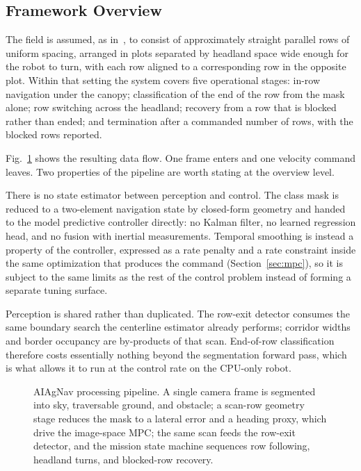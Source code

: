 \documentclass[conference]{IEEEtran}
\begin{document}
\subsection{Framework Overview}
The field is assumed, as in~\cite{kim2025pagnav}, to consist of approximately
straight parallel rows of uniform spacing, arranged in plots separated by
headland space wide enough for the robot to turn, with each row aligned to a
corresponding row in the opposite plot. Within that setting the system covers
five operational stages: in-row navigation under the canopy; classification of
the end of the row from the mask alone; row switching across the headland;
recovery from a row that is blocked rather than ended; and termination after a
commanded number of rows, with the blocked rows reported.

Fig.~\ref{fig:pipeline} shows the resulting data flow. One frame enters and one
velocity command leaves. Two properties of the pipeline are worth stating at
the overview level.

There is no state estimator between perception and control. The class mask is
reduced to a two-element navigation state by closed-form geometry and handed to
the model predictive controller directly: no Kalman filter, no learned
regression head, and no fusion with inertial measurements. Temporal smoothing is
instead a property of the controller, expressed as a rate penalty and a rate
constraint inside the same optimization that produces the command
(Section~\ref{sec:mpc}), so it is subject to the same limits as the rest of the
control problem instead of forming a separate tuning surface.

Perception is shared rather than duplicated. The row-exit detector consumes the
same boundary search the centerline estimator already performs; corridor widths
and border occupancy are by-products of that scan. End-of-row classification
therefore costs essentially nothing beyond the segmentation forward pass, which
is what allows it to run at the control rate on the CPU-only robot.

\begin{figure}[t]
\centering

\caption{AIAgNav processing pipeline. A single camera frame is segmented into
sky, traversable ground, and obstacle; a scan-row geometry stage reduces the
mask to a lateral error and a heading proxy, which drive the image-space MPC;
the same scan feeds the row-exit detector, and the mission state machine
sequences row following, headland turns, and blocked-row recovery.}
\label{fig:pipeline}
\end{figure}
\end{document}
